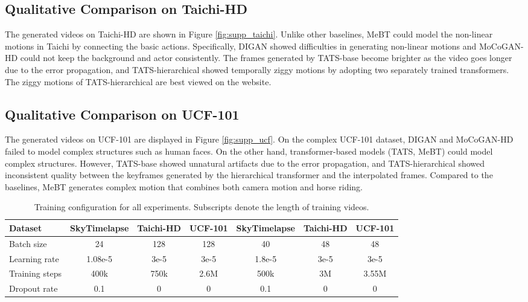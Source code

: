\documentclass[10pt,twocolumn,letterpaper]{article}
\begin{document}
\subsection{Qualitative Comparison on Taichi-HD}
The generated videos on Taichi-HD are shown in Figure \ref{fig:supp_taichi}. Unlike other baselines, MeBT could model the non-linear motions in Taichi by connecting the basic actions. Specifically, DIGAN showed difficulties in generating non-linear motions and MoCoGAN-HD could not keep the background and actor consistently. The frames generated by TATS-base become brighter as the video goes longer due to the error propagation, and TATS-hierarchical showed temporally ziggy motions by adopting two separately trained transformers. The ziggy motions of TATS-hierarchical are best viewed on the website.

\subsection{Qualitative Comparison on UCF-101}
The generated videos on UCF-101 are displayed in Figure \ref{fig:supp_ucf}. On the complex UCF-101 dataset, DIGAN and MoCoGAN-HD failed to model complex structures such as human faces. On the other hand, transformer-based models (TATS, MeBT) could model complex structures. However, TATS-base showed unnatural artifacts due to the error propagation, and TATS-hierarchical showed inconsistent quality between the keyframes generated by the hierarchical transformer and the interpolated frames. Compared to the baselines, MeBT generates complex motion that combines both camera motion and horse riding.





\begin{table*}[t]
    \centering
    \caption{Training configuration for all experiments. Subscripts denote the length of training videos.}
    \label{tab:train_config}
    \begin{tabular}{l|cccccc}
    \toprule
    Dataset & SkyTimelapse & Taichi-HD & UCF-101 & SkyTimelapse & Taichi-HD& UCF-101\\
    \midrule
    Batch size & 24 & 128 & 128 & 40 & 48 & 48\\
    Learning rate & 1.08e-5 & 3e-5 & 3e-5 & 1.8e-5 & 3e-5 & 3e-5\\
    Training steps & 400k & 750k & 2.6M & 500k & 3M & 3.55M \\
    Dropout rate & 0.1 & 0 & 0 & 0.1 & 0 & 0 \\
    \bottomrule
    \end{tabular}
\end{table*}
\end{document}
